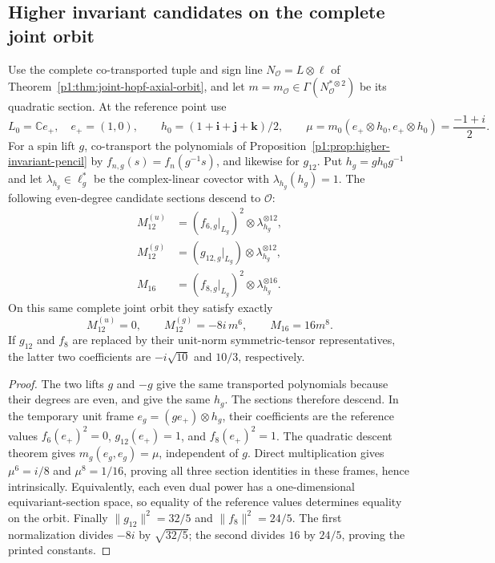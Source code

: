 \documentclass[11pt]{article}
\begin{document}
\subsection{Higher invariant candidates on the complete joint orbit}
\label{p1:sec:v215-higher-joint-dependencies}

\begin{proposition}
\label{p1:prop:v215-higher-joint-dependencies}
Use the complete co-transported tuple and sign line
\(N_{\mathcal O}=L\otimes\ell\) of
Theorem~\ref{p1:thm:joint-hopf-axial-orbit}, and let
\(m=m_{\mathcal O}\in\Gamma(N_{\mathcal O}^{*\otimes2})\) be its
quadratic section. At the reference point use
\[
 L_0=\mathbb C e_+,\quad e_+=(1,0),\qquad
 h_0=(1+\mathbf i+\mathbf j+\mathbf k)/2,\qquad
 \mu=m_0(e_+\otimes h_0,e_+\otimes h_0)=\frac{-1+i}{2}.
\]
For a spin lift \(g\), co-transport the polynomials of
Proposition~\ref{p1:prop:higher-invariant-pencil} by
\(f_{n,g}(s)=f_n(g^{-1}s)\), and likewise for \(g_{12}\).
Put \(h_g=gh_0g^{-1}\) and let \(\lambda_{h_g}\in\ell_g^*\)
be the complex-linear covector with \(\lambda_{h_g}(h_g)=1\).
The following even-degree candidate sections descend to \(\mathcal O\):
\[
 \begin{split}
 M_{12}^{(u)}&=(f_{6,g}|_{L_g})^2\otimes\lambda_{h_g}^{\otimes12},\\
 M_{12}^{(g)}&=(g_{12,g}|_{L_g})\otimes\lambda_{h_g}^{\otimes12},\\
 M_{16}&=(f_{8,g}|_{L_g})^2\otimes\lambda_{h_g}^{\otimes16}.
 \end{split}
\]
On this same complete joint orbit they satisfy exactly
\[
 M_{12}^{(u)}=0,\qquad M_{12}^{(g)}=-8i\,m^6,
 \qquad M_{16}=16m^8.
\]
If \(g_{12}\) and \(f_8\) are replaced by their unit-norm
symmetric-tensor representatives, the latter two coefficients are
\(-i\sqrt{10}\) and \(10/3\), respectively.
\end{proposition}
\begin{proof}
The two lifts \(g\) and \(-g\) give the same transported polynomials
because their degrees are even, and give the same \(h_g\). The
sections therefore descend. In the temporary unit frame
\(e_g=(ge_+)\otimes h_g\), their coefficients are the reference
values \(f_6(e_+)^2=0\), \(g_{12}(e_+)=1\), and
\(f_8(e_+)^2=1\). The quadratic descent theorem gives
\(m_g(e_g,e_g)=\mu\), independent of \(g\). Direct multiplication
gives \(\mu^6=i/8\) and \(\mu^8=1/16\), proving all three
section identities in these frames, hence intrinsically. Equivalently,
each even dual power has a one-dimensional equivariant-section space,
so equality of the reference values determines equality on the orbit.
Finally \(\|g_{12}\|^2=32/5\) and \(\|f_8\|^2=24/5\).
The first normalization divides \(-8i\) by \(\sqrt{32/5}\);
the second divides \(16\) by \(24/5\), proving the printed constants.
\end{proof}
\end{document}
